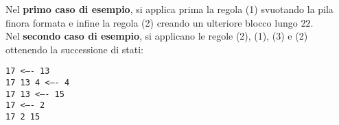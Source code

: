 

\Examples
\begin{example}
%
%
\end{example}


\Explanation
Nel \textbf{primo caso di esempio}, si applica prima la regola (1) svuotando la pila finora formata e infine la regola (2) creando un ulteriore blocco lungo $22$.\\[2mm]
Nel \textbf{secondo caso di esempio}, si applicano le regole (2), (1), (3) e (2) ottenendo la successione di stati:
\begin{center}
\texttt{17 <---- 13\\
17 13 4 <---- 4\\
17 13  <---- 15\\
17 <---- 2\\
17 2 15
}
\end{center}
